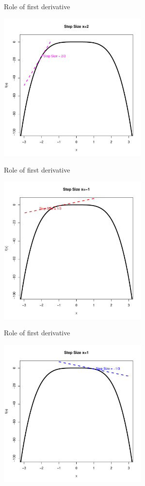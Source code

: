 \documentclass[10pt]{beamer}
\begin{document}
\begin{frame}{Role of first derivative}
  \begin{center}
    \includegraphics[height=7.5cm]{RCode/climb1.pdf}
  \end{center}
\end{frame}
\begin{frame}{Role of first derivative}
  \begin{center}
    \includegraphics[height=7.5cm]{RCode/climb2.pdf}
  \end{center}
\end{frame}
\begin{frame}{Role of first derivative}
  \begin{center}
    \includegraphics[height=7.5cm]{RCode/climb3.pdf}
  \end{center}
\end{frame}
\end{document}
